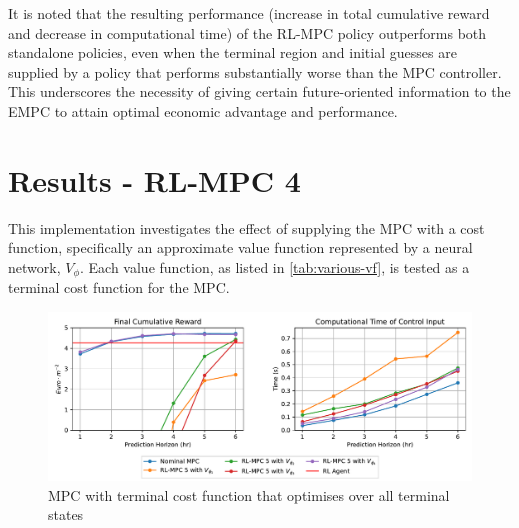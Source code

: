 It is noted that the resulting performance (increase in total cumulative reward and decrease in computational time) of the RL-MPC policy outperforms both standalone policies, even when the terminal region and initial guesses are supplied by a policy that performs substantially worse than the MPC controller. This underscores the necessity of giving certain future-oriented information to the EMPC to attain optimal economic advantage and performance. 

\section{Results - RL-MPC 4}
This implementation investigates the effect of supplying the MPC with a cost function, specifically an approximate value function represented by a neural network, $V_{\phi}$. Each value function, as listed in \autoref{tab:various-vf}, is tested as a terminal cost function for the MPC.


\begin{figure}[H]
	\centering
	\includegraphics[width=\textwidth]{figures/rl_mpc_impl_4.pdf}
	\caption{MPC with terminal cost function that optimises over all terminal states}
	\label{fig:rlmpc-impl4-all-states}
\end{figure}

